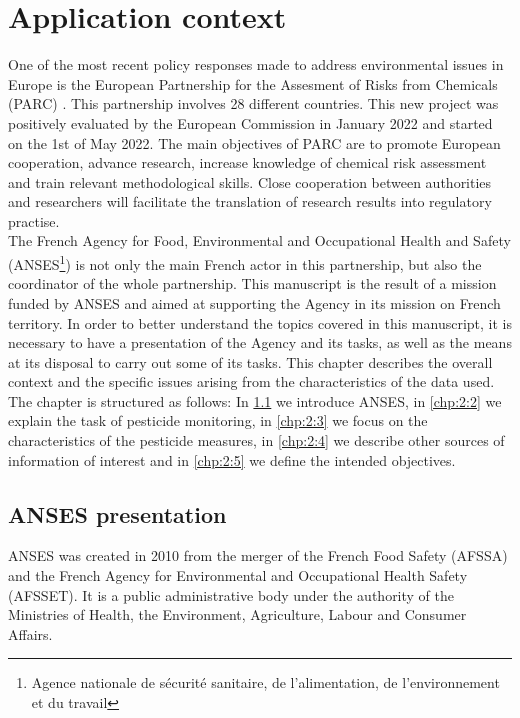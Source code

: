\chapter{Application context}\label{chp:2}

\minitoc

\clearpage

One of the most recent policy responses made to address environmental issues in Europe is the European Partnership for the Assesment of Risks from Chemicals (PARC) \citep{PARC}. This partnership involves 28 different countries. This new project was positively evaluated by the European Commission in January 2022 and started on the 1st of May 2022. The main objectives of PARC are to promote European cooperation, advance research, increase knowledge of chemical risk assessment and train relevant methodological skills. Close cooperation between authorities and researchers will facilitate the translation of research results into regulatory practise. \\
The French Agency for Food, Environmental and Occupational Health and Safety (ANSES\footnote{Agence nationale de sécurité sanitaire, de l'alimentation, de l'environnement et du travail}) is not only the main French actor in this partnership, but also the coordinator of the whole partnership. This manuscript is the result of a mission funded by ANSES and aimed at supporting the Agency in its mission on French territory. In order to better understand the topics covered in this manuscript, it is necessary to have a presentation of the Agency and its tasks, as well as the means at its disposal to carry out some of its tasks. This chapter describes the overall context and the specific issues arising from the characteristics of the data used. The chapter is structured as follows: In \ref{chp:2:1} we introduce ANSES, in \ref{chp:2:2} we explain the task of pesticide monitoring, in \ref{chp:2:3} we focus on the characteristics of the pesticide measures, in \ref{chp:2:4} we describe other sources of information of interest and in \ref{chp:2:5} we define the intended objectives.

\section{ANSES presentation}\label{chp:2:1}

ANSES was created in 2010 from the merger of the French Food Safety (AFSSA) and the French Agency for Environmental and Occupational Health Safety (AFSSET). It is a public administrative body under the authority of the Ministries of Health, the Environment, Agriculture, Labour and Consumer Affairs.

